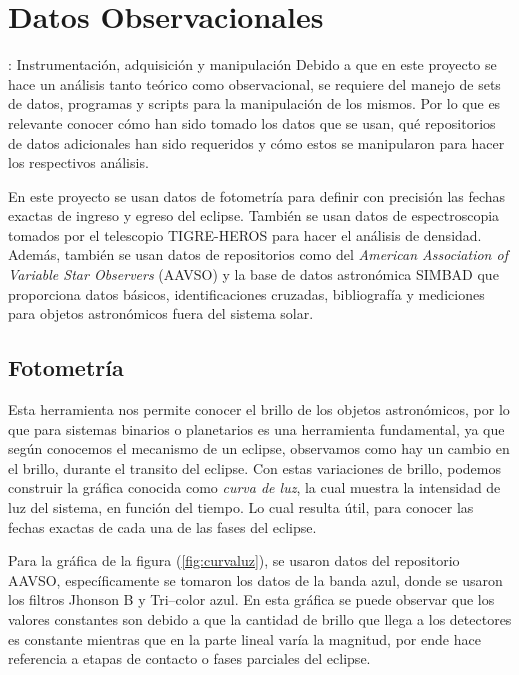 \documentclass[12pt,oneside,openany,letter]{book}
\begin{document}





\chapter{Datos Observacionales} : Instrumentación, adquisición y manipulación \label{cap3}
Debido a que en este proyecto se hace un análisis tanto teórico como observacional, se requiere del manejo de sets de datos, programas y scripts para la manipulación de los mismos. Por lo que es relevante conocer cómo han sido tomado los datos que se usan, qué repositorios de datos adicionales han sido requeridos y cómo estos se manipularon para hacer los respectivos análisis.

\noindent En este proyecto se usan datos de fotometría para definir con precisión las fechas exactas de ingreso y egreso del eclipse. También se usan datos de espectroscopia tomados por el telescopio TIGRE-HEROS para hacer el análisis de densidad. Además, también se usan datos de repositorios como del \textit{American Association of Variable Star Observers} (AAVSO) y la base de datos astronómica SIMBAD que proporciona datos básicos, identificaciones cruzadas, bibliografía y mediciones para objetos astronómicos fuera del sistema solar.


\section{Fotometría}
Esta herramienta nos permite conocer el brillo de los objetos astronómicos, por lo que para sistemas binarios o planetarios es una herramienta fundamental, ya que según conocemos el mecanismo de un eclipse, observamos como hay un cambio en el brillo, durante el transito del eclipse. Con estas variaciones de brillo, podemos construir la gráfica conocida como \textit{curva de luz}, la cual muestra la intensidad de luz del sistema, en función del tiempo. Lo cual resulta útil, para conocer las fechas exactas de cada una de las fases del eclipse.
\vspace{2mm}

\noindent Para la gráfica de la figura (\ref{fig:curvaluz}), se usaron datos del repositorio AAVSO, específicamente se tomaron los datos de la banda azul, donde se usaron los filtros Jhonson B y Tri–color azul. En esta gráfica se puede observar que los valores constantes son debido a que la cantidad de brillo que llega a los detectores es constante mientras que en la parte lineal varía la magnitud, por ende hace referencia a etapas de contacto o fases parciales del eclipse.
\end{document}
